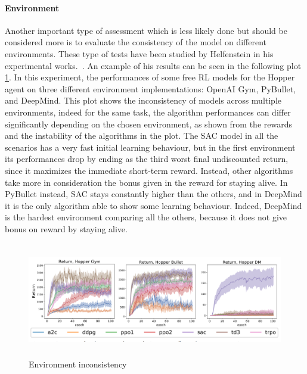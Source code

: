 \documentclass{article}
\begin{document}
\paragraph{Environment}
Another important type of assessment which is less likely done but should be considered more is to evaluate the consistency of the model on different environments. These type of tests have been studied by Helfenstein in his experimental works.~\cite{BenchmarkingDRL}. An example of his results can be seen in the following plot \ref{fig:env}. In this experiment, the performances of some free RL models for the Hopper agent on three different environment implementations: OpenAI Gym, PyBullet, and DeepMind. This plot shows the inconsistency of  models across multiple environments, indeed for the same task, the algorithm performances can differ significantly depending on the chosen environment, as shown from the rewards and the instability of the algorithms in the plot.
The SAC model in all the scenarios has a very fast initial learning behaviour, but in the first environment its performances drop by ending as the third worst final undiscounted return, since it maximizes the immediate short-term reward. Instead, other algorithms take more in consideration the bonus given in the reward for staying alive. In PyBullet instead, SAC stays constantly higher than the others, and in DeepMind it is the only algorithm able to show some learning behaviour. Indeed, DeepMind is the hardest environment comparing all the others, because it does not give bonus on reward by staying alive.

\begin{figure}[!htp]
	\centering
	\includegraphics[width=15cm,height=5cm]{./images/Environements_plot.png}
	\caption{Environment inconsistency \cite{BenchmarkingDRL}}
	\label{fig:env}
	\footnotesize{}
\end{figure}
\end{document}
